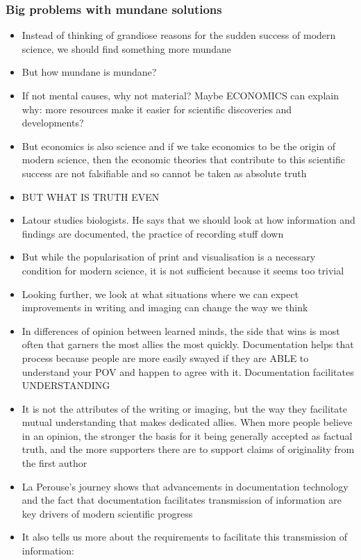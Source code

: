 \documentclass[a4paper]{article}
\begin{document}
\subsubsection{Big problems with mundane solutions}
\begin{itemize}
	\item Instead of thinking of grandiose reasons for the sudden success of modern science, we should find something more mundane
	\item But how mundane is mundane?
	\item If not mental causes, why not material? Maybe ECONOMICS can explain why: more resources make it easier for scientific discoveries and developments?
	\item But economics is also science and if we take economics to be the origin of modern science, then the economic theories that contribute to this scientific success are not falsifiable and so cannot be taken as absolute truth
	\item BUT WHAT IS TRUTH EVEN
	\item Latour studies biologists. He says that we should look at how information and findings are documented, the practice of recording stuff down
	\item But while the popularisation of print and visualisation is a necessary condition for modern science, it is not sufficient because it seems too trivial
	\item Looking further, we look at what situations where we can expect improvements in writing and imaging can change the way we think
	\item In differences of opinion between learned minds, the side that wins is most often that garners the most allies the most quickly. Documentation helps that process because people are more easily swayed if they are ABLE to understand your POV and happen to agree with it. Documentation facilitates UNDERSTANDING
	\item It is not the attributes of the writing or imaging, but the way they facilitate mutual understanding that makes dedicated allies. When more people believe in an opinion, the stronger the basis for it being generally accepted as factual truth, and the more supporters there are to support claims of originality from the first author
	\item La Perouse’s journey shows that advancements in documentation technology and the fact that documentation facilitates transmission of information are key drivers of modern scientific progress
	\item It also tells us more about the requirements to facilitate this transmission of information:

\end{itemize}
\end{document}

